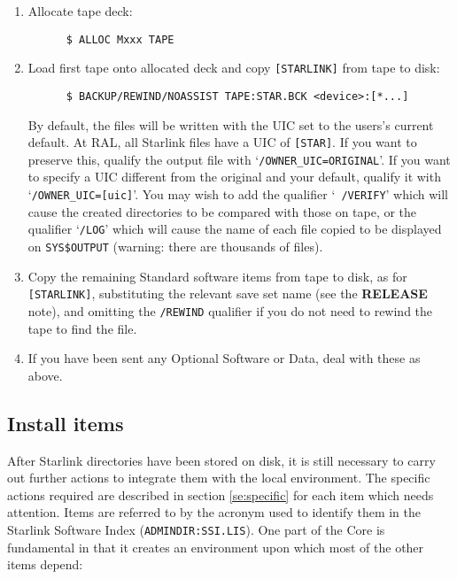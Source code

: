 \begin{enumerate}

\item Allocate tape deck:

\begin{verbatim}
      $ ALLOC Mxxx TAPE
\end{verbatim}

\item Load first tape onto allocated deck and copy {\tt [STARLINK]} from tape 
to disk:

\begin{verbatim}
      $ BACKUP/REWIND/NOASSIST TAPE:STAR.BCK <device>:[*...]
\end{verbatim}

By default, the files will be written with the UIC set to the users's current
default. At RAL, all Starlink files have a UIC of {\tt [STAR]}. If you want to
preserve this, qualify the output file with `{\tt /OWNER\_UIC=ORIGINAL}'. If
you want to specify a UIC different from the original and your default, qualify
it with `{\tt /OWNER\_UIC=[uic]}'. You may wish to add the qualifier `{\tt
/VERIFY}' which will cause the created directories to be compared with those on
tape, or the qualifier `{\tt/LOG}' which will cause the name of each file
copied to be displayed on {\tt SYS\$OUTPUT} (warning: there are thousands of
files).

\item Copy the remaining Standard software items from tape to disk, as for {\tt
[STARLINK]}, substituting the relevant save set name (see the {\bf RELEASE}
note), and omitting the {\tt /REWIND} qualifier if you do not need to rewind
the tape to find the file.

\item If you have been sent any Optional Software or Data, deal with these as
above.

\end{enumerate}

\subsection {Install items}
\label{ss:install}

After Starlink directories have been stored on disk, it is still necessary to
carry out further actions to integrate them with the local environment. The
specific actions required are described in section \ref{se:specific} for each
item which needs attention. Items are referred to by the acronym used to
identify them in the Starlink Software Index ({\tt ADMINDIR:SSI.LIS}). One part
of the Core is fundamental in that it creates an environment upon which most
of the other items depend:

